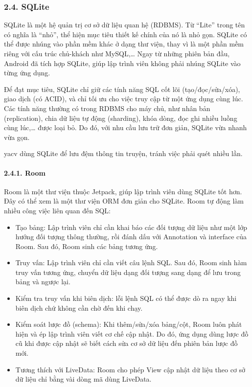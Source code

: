 \hypertarget{sqlite}{%
  \subsubsection{\texorpdfstring{2.4. SQLite
    }{2.4. SQLite }}\label{sqlite}}

SQLite là một hệ quản trị cơ sở dữ liệu quan hệ (RDBMS). Từ ``Lite''
trong tên có nghĩa là ``nhỏ'', thể hiện mục tiêu thiết kế chính của nó
là nhỏ gọn. SQLite có thể được nhúng vào phần mềm khác ở dạng thư viện,
thay vì là một phần mềm riêng với cấu trúc chủ-khách như MySQL,\ldots{}
Ngay từ những phiên bản đầu, Android đã tích hợp SQLite, giúp lập trình
viên không phải nhúng SQLite vào từng ứng dụng.

Để đạt mục tiêu, SQLite chỉ giữ các tính năng SQL cốt lõi
(tạo/đọc/sửa/xóa), giao dịch (có ACID), và chỉ tối ưu cho việc truy cập
từ một ứng dụng cùng lúc. Các tính năng thường có trong RDBMS cho máy
chủ, như nhân bản (replication), chia dữ liệu tự động (sharding), khóa
dòng, đọc ghi nhiều luồng cùng lúc,\ldots{} được loại bỏ. Do đó, với nhu
cầu lưu trữ đơn giản, SQLite vừa nhanh vừa gọn.

yacv dùng SQLite để lưu đệm thông tin truyện, tránh việc phải quét nhiều
lần.

\hypertarget{room}{%
  \paragraph{\texorpdfstring{2.4.1. Room }{2.4.1. Room }}\label{room}}

Room là một thư viện thuộc Jetpack, giúp lập trình viên dùng SQLite tốt
hơn. Đây có thể xem là một thư viện ORM đơn giản cho SQLite. Room tự
động làm nhiều công việc liên quan đến SQL:

\begin{itemize}
  
  \item
        Tạo bảng: Lập trình viên chỉ cần khai báo các đối tượng dữ liệu như
        một lớp hướng đối tượng thông thường, rồi đánh dấu với Annotation và
        interface của Room. Sau đó, Room sinh các bảng tương ứng.
  \item
        Truy vấn: Lập trình viên chỉ cần viết câu lệnh SQL. Sau đó, Room sinh
        hàm truy vấn tương ứng, chuyển dữ liệu dạng đối tượng sang dạng để lưu
        trong bảng và ngược lại.
  \item
        Kiểm tra truy vấn khi biên dịch: lỗi lệnh SQL có thể được dò ra ngay
        khi biên dịch chứ không cần chờ đến khi chạy.
  \item
        Kiểm soát lược đồ (schema): Khi thêm/sửa/xóa bảng/cột, Room luôn phát
        hiện và ép lập trình viên viết cơ chế cập nhật. Do đó, ứng dụng dùng
        lược đồ cũ khi được cập nhật sẽ biết cách sửa cơ sở dữ liệu đến phiên
        bản lược đồ mới.
  \item
        Tương thích với LiveData: Room cho phép View cập nhật dữ liệu theo cơ
        sở dữ liệu chỉ bằng vài dòng mã dùng LiveData.
\end{itemize}


